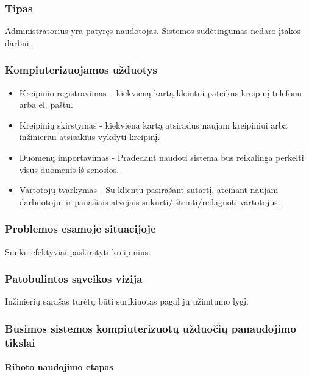 		\subsubsection{Tipas}
		
		Administratorius yra patyręs naudotojas. Sistemos sudėtingumas nedaro įtakos darbui.
		
		\subsubsection{Kompiuterizuojamos užduotys}
		
		\begin{itemize}
			\item Kreipinio registravimas – kiekvieną kartą kleintui pateikus kreipinį telefonu arba el. paštu.
			\item Kreipinių skirstymas - kiekvieną kartą atsiradus naujam kreipiniui arba inžinieriui atsisakius vykdyti kreipinį.
			\item Duomenų importavimas - Pradedant naudoti sistema bus reikalinga perkelti visus duomenis iš senosios.
			\item Vartotojų tvarkymas - Su klientu pasirašant sutartį, ateinant naujam darbuotojui ir panašiais atvejais sukurti/ištrinti/redaguoti vartotojus.
		\end{itemize}
		
		\subsubsection{Problemos esamoje situacijoje}
		
		Sunku efektyviai paskirstyti kreipinius.
		
		\subsubsection{Patobulintos sąveikos vizija}
		
		Inžinierių sąrašas turėtų būti surikiuotas pagal jų užimtumo lygį.
		
		\subsubsection{Būsimos sistemos kompiuterizuotų užduočių panaudojimo tikslai}
		
			\setcounter{tocdepth}{5} \setcounter{secnumdepth}{5}
			
			\paragraph{Riboto naudojimo etapas}
			
